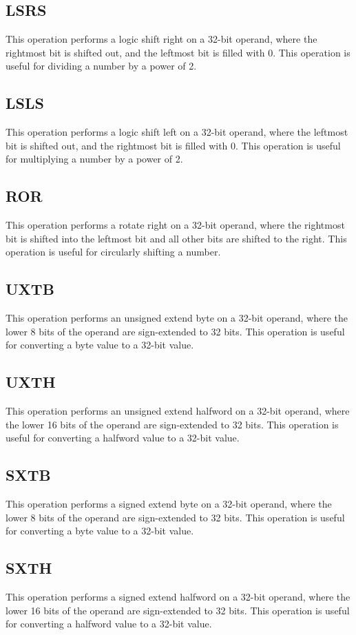 \documentclass[9pt,a4paper,twoside]{tau}
\begin{document}
        \subsection{LSRS}
        This operation performs a logic shift right on a 32-bit operand, where the rightmost bit is shifted out, and the leftmost bit is filled with 0. This operation is useful for dividing a number by a power of 2. 
        \subsection{LSLS}
        This operation performs a logic shift left on a 32-bit operand, where the leftmost bit is shifted out, and the rightmost bit is filled with 0. This operation is useful for multiplying a number by a power of 2. 
        \subsection{ROR}
        This operation performs a rotate right on a 32-bit operand, where the rightmost bit is shifted into the leftmost bit and all other bits are shifted to the right. This operation is useful for circularly shifting a number. 
        \subsection{UXTB}
        This operation performs an unsigned extend byte on a 32-bit operand, where the lower 8 bits of the operand are sign-extended to 32 bits. This operation is useful for converting a byte value to a 32-bit value. 
        \subsection{UXTH}
        This operation performs an unsigned extend halfword on a 32-bit operand, where the lower 16 bits of the operand are sign-extended to 32 bits. This operation is useful for converting a halfword value to a 32-bit value. 
        \subsection{SXTB}
        This operation performs a signed extend byte on a 32-bit operand, where the lower 8 bits of the operand are sign-extended to 32 bits. This operation is useful for converting a byte value to a 32-bit value. 
        \subsection{SXTH}
        This operation performs a signed extend halfword on a 32-bit operand, where the lower 16 bits of the operand are sign-extended to 32 bits. This operation is useful for converting a halfword value to a 32-bit value. 
\end{document}
